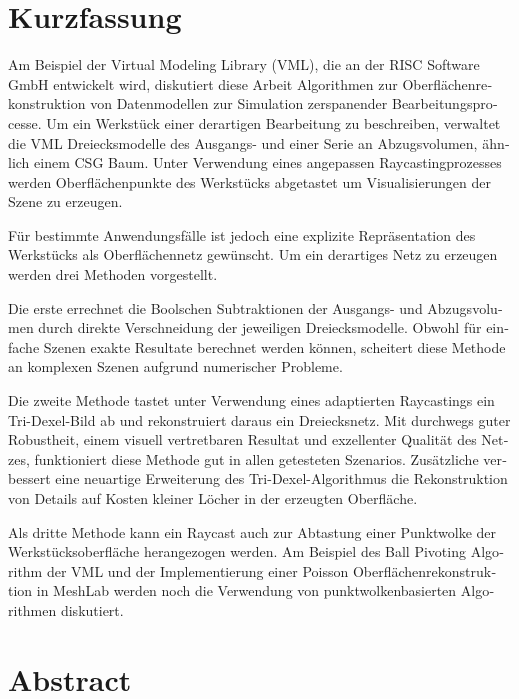 \chapter*{Kurzfassung}

\begin{otherlanguage}{ngerman}
	Am Beispiel der Virtual Modeling Library (VML), die an der RISC Software GmbH entwickelt wird, diskutiert diese Arbeit Algorithmen zur Oberflächenrekonstruktion von Datenmodellen zur Simulation zerspanender Bearbeitungsprocesse.
	Um ein Werkstück einer derartigen Bearbeitung zu beschreiben, verwaltet die VML Dreiecksmodelle des Ausgangs- und einer Serie an Abzugsvolumen, ähnlich einem CSG Baum.
	Unter Verwendung eines angepassen Raycastingprozesses werden Oberflächenpunkte des Werkstücks abgetastet um Visualisierungen der Szene zu erzeugen.
	
	Für bestimmte Anwendungsfälle ist jedoch eine explizite Repräsentation des Werkstücks als Oberflächennetz gewünscht.
	Um ein derartiges Netz zu erzeugen werden drei Methoden vorgestellt.
	
	Die erste errechnet die Boolschen Subtraktionen der Ausgangs- und Abzugsvolumen durch direkte Verschneidung der jeweiligen Dreiecksmodelle.
	Obwohl für einfache Szenen exakte Resultate berechnet werden können, scheitert diese Methode an komplexen Szenen aufgrund numerischer Probleme.
	
	Die zweite Methode tastet unter Verwendung eines adaptierten Raycastings ein Tri-Dexel-Bild ab und rekonstruiert daraus ein Dreiecksnetz.
	Mit durchwegs guter Robustheit, einem visuell vertretbaren Resultat und exzellenter Qualität des Netzes, funktioniert diese Methode gut in allen getesteten Szenarios.
	Zusätzliche verbessert eine neuartige Erweiterung des Tri-Dexel-Algorithmus die Rekonstruktion von Details auf Kosten kleiner Löcher in der erzeugten Oberfläche.
	
	Als dritte Methode kann ein Raycast auch zur Abtastung einer Punktwolke der Werkstücksoberfläche herangezogen werden.
	Am Beispiel des Ball Pivoting Algorithm der VML und der Implementierung einer Poisson Oberflächenrekonstruktion in MeshLab werden noch die Verwendung von punktwolkenbasierten Algorithmen diskutiert.
\end{otherlanguage}

\pagebreak

\chapter*{Abstract}


